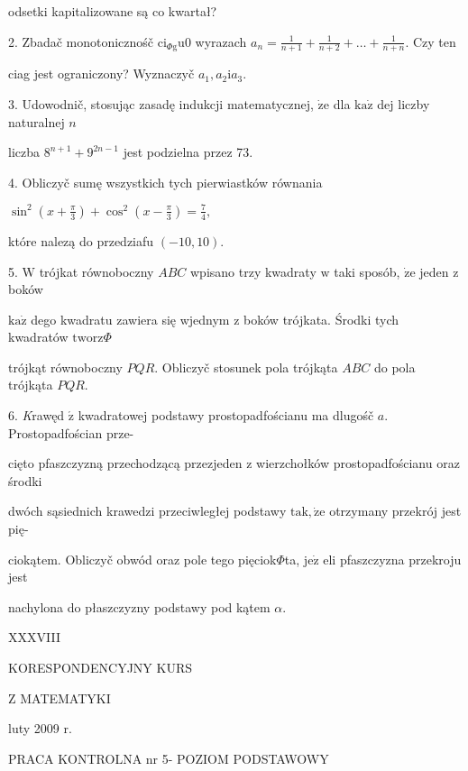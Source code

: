 \documentclass[a4paper,12pt]{article}
\begin{document}
odsetki kapitalizowane są co kwartał?

2. Zbadač monotonicznośč $\mathrm{c}\mathrm{i}_{\Phi \mathrm{g}}\mathrm{u}0$ wyrazach $a_{n}=\displaystyle \frac{1}{n+1}+\frac{1}{n+2}+\ldots+\frac{1}{n+n}$. Czy ten

ciag jest ograniczony? Wyznaczyč $a_{1}, a_{2}\mathrm{i}a_{3}.$

3. Udowodnič, stosując zasadę indukcji matematycznej, $\dot{\mathrm{z}}\mathrm{e}$ dla $\mathrm{k}\mathrm{a}\dot{\mathrm{z}}$ dej liczby naturalnej $n$

liczba $8^{n+1}+9^{2n-1}$ jest podzielna przez 73.

4. Obliczyč sumę wszystkich tych pierwiastków równania

$\displaystyle \sin^{2}(x+\frac{\pi}{3})+\cos^{2}(x-\frac{\pi}{3})=\frac{7}{4},$

które nalezą do przedziafu $(-10,10).$

5. $\mathrm{W}$ trójkat równoboczny $ABC$ wpisano trzy kwadraty $\mathrm{w}$ taki sposób, $\dot{\mathrm{z}}\mathrm{e}$ jeden $\mathrm{z}$ boków

$\mathrm{k}\mathrm{a}\dot{\mathrm{z}}$ dego kwadratu zawiera się wjednym $\mathrm{z}$ boków trójkata. Środki tych kwadratów $\mathrm{t}\mathrm{w}\mathrm{o}\mathrm{r}\mathrm{z}\Phi$

trójkąt równoboczny $PQR$. Obliczyč stosunek pola trójkąta $ABC$ do pola trójkąta $PQR.$

6. {\it K}rawęd $\acute{\mathrm{z}}$ kwadratowej podstawy prostopadfościanu ma dlugośč $a$. Prostopadfościan prze-

cięto pfaszczyzną przechodzącą przezjeden $\mathrm{z}$ wierzchołków prostopadfościanu oraz środki

dwóch sąsiednich krawedzi przeciwległej podstawy $\mathrm{t}\mathrm{a}\mathrm{k}, \dot{\mathrm{z}}\mathrm{e}$ otrzymany przekrój jest pię-

ciokątem. Obliczyč obwód oraz pole tego pięciok$\Phi$ta, $\mathrm{j}\mathrm{e}\dot{\mathrm{z}}$ eli pfaszczyzna przekroju jest

nachylona do płaszczyzny podstawy pod kątem $\alpha.$





XXXVIII

KORESPONDENCYJNY KURS

Z MATEMATYKI

luty 2009 r.

PRACA KONTROLNA nr 5- POZIOM PODSTAWOWY
\end{document}
